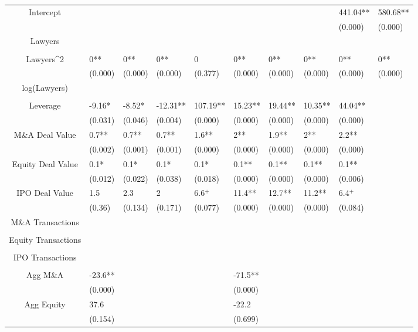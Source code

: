 \documentclass{article}
\begin{document}
\begin{table}[H]
\begin{tabular}{|clllllllll|}
Intercept &  &  &  &  &  &  &  & 441.04** & 580.68** \\ 
   &  &  &  &  &  &  &  & (0.000) & (0.000) \\ 
  Lawyers &  &  &  &  &  &  &  &  &  \\ 
   &  &  &  &  &  &  &  &  &  \\ 
  Lawyers^2 & 0** & 0** & 0** & 0 & 0** & 0** & 0** & 0** & 0** \\ 
   & (0.000) & (0.000) & (0.000) & (0.377) & (0.000) & (0.000) & (0.000) & (0.000) & (0.000) \\ 
  log(Lawyers) &  &  &  &  &  &  &  &  &  \\ 
   &  &  &  &  &  &  &  &  &  \\ 
  Leverage & -9.16* & -8.52* & -12.31** & 107.19** & 15.23** & 19.44** & 10.35** & 44.04** &  \\ 
   & (0.031) & (0.046) & (0.004) & (0.000) & (0.000) & (0.000) & (0.000) & (0.000) &  \\ 
  M\&A Deal Value & 0.7** & 0.7** & 0.7** & 1.6** & 2** & 1.9** & 2** & 2.2** &  \\ 
   & (0.002) & (0.001) & (0.001) & (0.000) & (0.000) & (0.000) & (0.000) & (0.000) &  \\ 
  Equity Deal Value & 0.1* & 0.1* & 0.1* & 0.1* & 0.1** & 0.1** & 0.1** & 0.1** &  \\ 
   & (0.012) & (0.022) & (0.038) & (0.018) & (0.000) & (0.000) & (0.000) & (0.006) &  \\ 
  IPO Deal Value & 1.5 & 2.3 & 2 & 6.6$^{+}$ & 11.4** & 12.7** & 11.2** & 6.4$^{+}$ &  \\ 
   & (0.36) & (0.134) & (0.171) & (0.077) & (0.000) & (0.000) & (0.000) & (0.084) &  \\ 
  M\&A Transactions &  &  &  &  &  &  &  &  &  \\ 
   &  &  &  &  &  &  &  &  &  \\ 
  Equity Transactions &  &  &  &  &  &  &  &  &  \\ 
   &  &  &  &  &  &  &  &  &  \\ 
  IPO Transactions &  &  &  &  &  &  &  &  &  \\ 
   &  &  &  &  &  &  &  &  &  \\ 
  Agg M\&A & -23.6** &  &  &  & -71.5** &  &  &  &  \\ 
   & (0.000) &  &  &  & (0.000) &  &  &  &  \\ 
  Agg Equity & 37.6 &  &  &  & -22.2 &  &  &  &  \\ 
   & (0.154) &  &  &  & (0.699) &  &  &  &  \\ 

\end{tabular}
\end{table}
\end{document}
